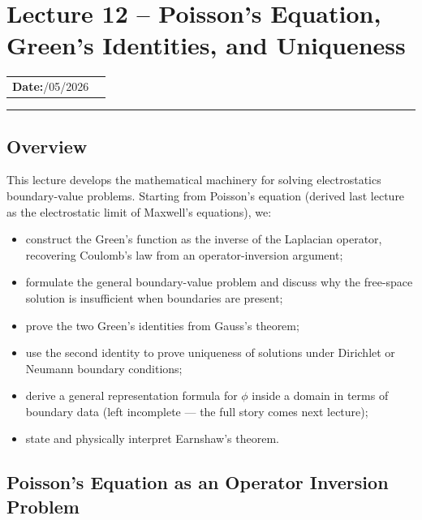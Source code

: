 \section{Lecture 12 -- Poisson's Equation, Green's Identities, and Uniqueness}\label{sec:lec12}

\begin{center}
\begin{tabular}{ll}
  \textbf{Date:}\quad 17/05/2026 & \\
\end{tabular}
\end{center}
\hrule\vspace{1.5em}

\subsection*{Overview}

This lecture develops the mathematical machinery for solving electrostatics boundary-value
problems.  Starting from Poisson's equation (derived last lecture as the electrostatic limit
of Maxwell's equations), we:
\begin{itemize}
  \item construct the Green's function as the inverse of the Laplacian operator, recovering
        Coulomb's law from an operator-inversion argument;
  \item formulate the general boundary-value problem and discuss why the free-space solution
        is insufficient when boundaries are present;
  \item prove the two Green's identities from Gauss's theorem;
  \item use the second identity to prove uniqueness of solutions under Dirichlet or Neumann
        boundary conditions;
  \item derive a general representation formula for $\phi$ inside a domain in terms of
        boundary data (left incomplete — the full story comes next lecture);
  \item state and physically interpret Earnshaw's theorem.
\end{itemize}

\subsection{Poisson's Equation as an Operator Inversion Problem}\label{subsec:lec12-operator}

